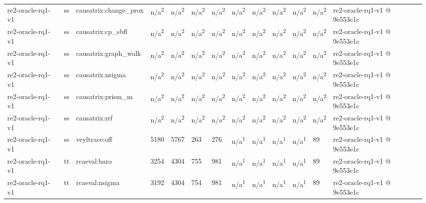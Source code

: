 \begin{table}[t]
\begin{tabular}{lllllllllllll}
re2-oracle-rq1-v1 & ss & causatrix:change\_prox & n/a\textsuperscript{2} & n/a\textsuperscript{2} & n/a\textsuperscript{2} & n/a\textsuperscript{2} & n/a\textsuperscript{2} & n/a\textsuperscript{2} & n/a\textsuperscript{2} & n/a\textsuperscript{2} & n/a\textsuperscript{2} & re2-oracle-rq1-v1 @ 9e553e1c \\
re2-oracle-rq1-v1 & ss & causatrix:cp\_sbfl & n/a\textsuperscript{2} & n/a\textsuperscript{2} & n/a\textsuperscript{2} & n/a\textsuperscript{2} & n/a\textsuperscript{2} & n/a\textsuperscript{2} & n/a\textsuperscript{2} & n/a\textsuperscript{2} & n/a\textsuperscript{2} & re2-oracle-rq1-v1 @ 9e553e1c \\
re2-oracle-rq1-v1 & ss & causatrix:graph\_walk & n/a\textsuperscript{2} & n/a\textsuperscript{2} & n/a\textsuperscript{2} & n/a\textsuperscript{2} & n/a\textsuperscript{2} & n/a\textsuperscript{2} & n/a\textsuperscript{2} & n/a\textsuperscript{2} & n/a\textsuperscript{2} & re2-oracle-rq1-v1 @ 9e553e1c \\
re2-oracle-rq1-v1 & ss & causatrix:nsigma & n/a\textsuperscript{2} & n/a\textsuperscript{2} & n/a\textsuperscript{2} & n/a\textsuperscript{2} & n/a\textsuperscript{2} & n/a\textsuperscript{2} & n/a\textsuperscript{2} & n/a\textsuperscript{2} & n/a\textsuperscript{2} & re2-oracle-rq1-v1 @ 9e553e1c \\
re2-oracle-rq1-v1 & ss & causatrix:prism\_m & n/a\textsuperscript{2} & n/a\textsuperscript{2} & n/a\textsuperscript{2} & n/a\textsuperscript{2} & n/a\textsuperscript{2} & n/a\textsuperscript{2} & n/a\textsuperscript{2} & n/a\textsuperscript{2} & n/a\textsuperscript{2} & re2-oracle-rq1-v1 @ 9e553e1c \\
re2-oracle-rq1-v1 & ss & causatrix:rrf & n/a\textsuperscript{2} & n/a\textsuperscript{2} & n/a\textsuperscript{2} & n/a\textsuperscript{2} & n/a\textsuperscript{2} & n/a\textsuperscript{2} & n/a\textsuperscript{2} & n/a\textsuperscript{2} & n/a\textsuperscript{2} & re2-oracle-rq1-v1 @ 9e553e1c \\
re2-oracle-rq1-v1 & ss & veyltrace:off & 5180 & 5767 & 263 & 276 & n/a\textsuperscript{1} & n/a\textsuperscript{1} & n/a\textsuperscript{1} & n/a\textsuperscript{1} & 89 & re2-oracle-rq1-v1 @ 9e553e1c \\
re2-oracle-rq1-v1 & tt & rcaeval:baro & 3254 & 4304 & 755 & 981 & n/a\textsuperscript{1} & n/a\textsuperscript{1} & n/a\textsuperscript{1} & n/a\textsuperscript{1} & 89 & re2-oracle-rq1-v1 @ 9e553e1c \\
re2-oracle-rq1-v1 & tt & rcaeval:nsigma & 3192 & 4304 & 754 & 981 & n/a\textsuperscript{1} & n/a\textsuperscript{1} & n/a\textsuperscript{1} & n/a\textsuperscript{1} & 89 & re2-oracle-rq1-v1 @ 9e553e1c \\

\end{tabular}
\end{table}
